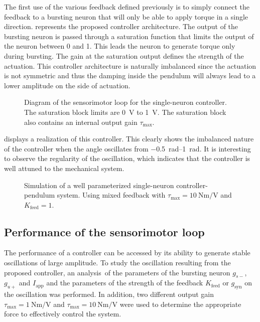 The first use of the various feedback defined previously is to simply connect the feedback to a bursting neuron that will only be able to apply torque in a single direction.
 represents the proposed controller architecture.
The output of the bursting neuron is passed through a saturation function that limits the output of the neuron between 0 and 1.
This leads the neuron to generate torque only during bursting.
The gain at the saturation output defines the strength of the actuation.
This controller architecture is naturally imbalanced since the actuation is not symmetric and thus the damping inside the pendulum will always lead to a lower amplitude on the side of actuation. 

\begin{figure}[!htb]
    \centering
    \caption{Diagram of the sensorimotor loop for the single-neuron controller. The saturation block limits are \qty{0}{\volt} to \qty{1}{\volt}. The saturation block also contains an internal output gain $\tau_\text{max}$.}
    \label{fig:one_motor}
\end{figure}

 displays a realization of this controller. This clearly shows the imbalanced nature of the controller when the angle oscillates from \qtyrange{-0.5}{1}{\radian}. It is interesting to observe the regularity of the oscillation, which indicates that the controller is well attuned to the mechanical system.

\begin{figure}[!htb]
    \centering
    \caption{Simulation of a well parameterized single-neuron controller-pendulum system. Using mixed feedback with $\tau_\text{max}=\qty{10}{\newton\meter\per\volt}$ and $K_\text{feed} = 1$.}
    \label{fig:one_motor_demo}
\end{figure}

\subsection{Performance of the sensorimotor loop}

The performance of a controller can be accessed by its ability to generate stable oscillations of large amplitude.
To study the oscillation resulting from the proposed controller, an analysis of the parameters of the bursting neuron $g_{s-}$, $g_{u+}$ and $I_\text{app}$ and the parameters of the strength of the feedback $K_\text{feed}$ or $g_\text{syn}$ on the oscillation was performed.
In addition, two different output gain $\tau_\text{max} = \qty{1}{\newton\meter\per\volt}$ and $\tau_\text{max} = \qty{10}{\newton\meter\per\volt}$ were used to determine the appropriate force to effectively control the system. 

